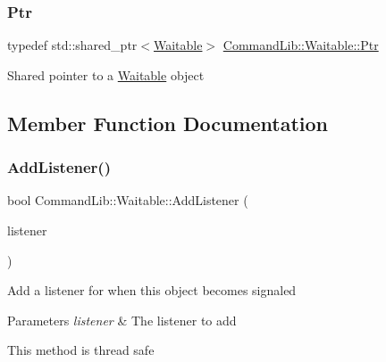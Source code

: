 \mbox{\label{class_command_lib_1_1_waitable_ac74b6b91e48220146eada76a31cf2d9b}} 
\subsubsection{\texorpdfstring{Ptr}{Ptr}}
{\footnotesize\ttfamily typedef std\+::shared\+\_\+ptr$<$\mbox{\hyperlink{class_command_lib_1_1_waitable}{Waitable}}$>$ \mbox{\hyperlink{class_command_lib_1_1_waitable_ac74b6b91e48220146eada76a31cf2d9b}{Command\+Lib\+::\+Waitable\+::\+Ptr}}}



Shared pointer to a \mbox{\hyperlink{class_command_lib_1_1_waitable}{Waitable}} object



\subsection{Member Function Documentation}
\mbox{\label{class_command_lib_1_1_waitable_afa4d25c0eb13db4222575f95036fbb22}} 
\subsubsection{\texorpdfstring{Add\+Listener()}{AddListener()}}
{\footnotesize\ttfamily bool Command\+Lib\+::\+Waitable\+::\+Add\+Listener (\begin{DoxyParamCaption}\item[{std\+::shared\+\_\+ptr$<$ \mbox{\hyperlink{class_command_lib_1_1_wait_monitor}{Wait\+Monitor}} $>$}]{listener }\end{DoxyParamCaption})}



Add a listener for when this object becomes signaled


\begin{DoxyParams}{Parameters}
{\em listener} & The listener to add\\
\hline
\end{DoxyParams}


This method is thread safe\mbox{\label{class_command_lib_1_1_waitable_ac14826c4ad004a59113899b7a3f3ebcf}} 
